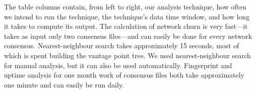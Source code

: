 The table columns contain, from left to right, our analysis technique, how often
we intend to run the technique, the technique's data time window, and how long
it takes to compute its output.  The calculation of network churn is very
fast---it takes as input only two consensus files---and can easily be done for
every network consensus.  Nearest-neighbour search takes approximately 15
seconds, most of which is spent building the vantage point tree.  We used
nearest-neighbour search for manual analysis, but it can also be used
automatically.  Fingerprint and uptime analysis for one month work of consensus
files both take approximately one minute and can easily be run daily.
